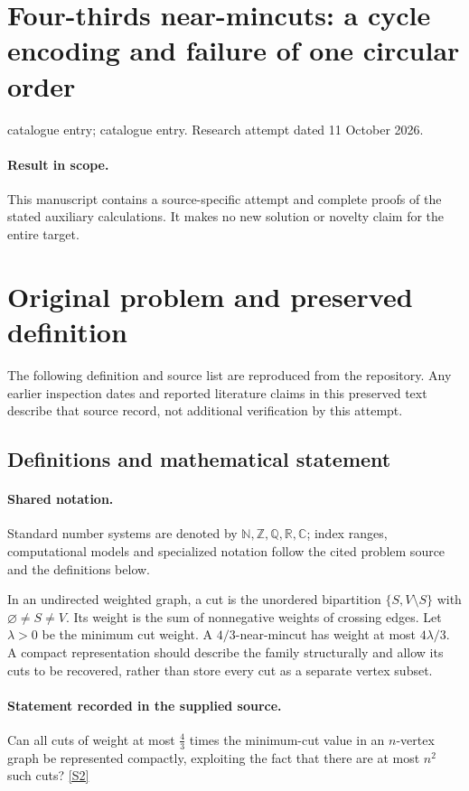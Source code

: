 \documentclass[11pt]{article}
\begin{document}
\section*{Four-thirds near-mincuts: a cycle encoding and failure of one circular order}
\noindent catalogue entry; catalogue entry. Research attempt dated 11 October 2026.
\paragraph{Result in scope.}This manuscript contains a source-specific attempt and complete proofs of the stated auxiliary calculations. It makes no new solution or novelty claim for the entire target.
\section{Original problem and preserved definition}
The following definition and source list are reproduced from the repository. Any earlier inspection dates and reported literature claims in this preserved text describe that source record, not additional verification by this attempt.
\subsection{Definitions and mathematical statement}

\paragraph{Shared notation.}Standard number systems are denoted by $\mathbb N,\mathbb Z,\mathbb Q,\mathbb R,\mathbb C$; index ranges, computational models and specialized notation follow the cited problem source and the definitions below.


In an undirected weighted graph, a cut is the unordered bipartition $\{S,V\setminus S\}$ with $\varnothing\ne S\ne V$. Its weight is the sum of nonnegative weights of crossing edges. Let $\lambda>0$ be the minimum cut weight. A $4/3$-near-mincut has weight at most $4\lambda/3$. A compact representation should describe the family structurally and allow its cuts to be recovered, rather than store every cut as a separate vertex subset.
\paragraph{Statement recorded in the supplied source.}
Can all cuts of weight at most $\tfrac43$ times the minimum-cut value in an $n$-vertex graph be represented compactly, exploiting the fact that there are at most $n^2$ such cuts? \href{https://doi.org/10.4171/owr/2021/53}{[S2]}
\end{document}
